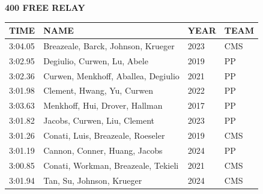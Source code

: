 \begin{table}[H]
\centering
\begin{minipage}[t]{0.6\textwidth}
\centering
\textbf{400 FREE RELAY}\\[0.1cm]
\begin{tabular}{@{}p{1.8cm}p{2.8cm}p{1.2cm}p{1.4cm}@{}}
\hline
    \textbf{TIME} & \textbf{NAME} & \textbf{YEAR} & \textbf{TEAM} \\
\hline
    3:04.05 & Breazeale, Barck, Johnson, Krueger & 2023 & CMS \\
    3:02.95 & Degiulio, Curwen, Lu, Abele & 2019 & PP \\
    3:02.36 & Curwen, Menkhoff, Aballea, Degiulio & 2021 & PP \\
    3:01.98 & Clement, Hwang, Yu, Curwen & 2022 & PP \\
    3:03.63 & Menkhoff, Hui, Drover, Hallman & 2017 & PP \\
    3:01.82 & Jacobs, Curwen, Liu, Clement & 2023 & PP \\
    3:01.26 & Conati, Luis, Breazeale, Roeseler & 2019 & CMS \\
    3:01.19 & Cannon, Conner, Huang, Jacobs & 2024 & PP \\
    3:00.85 & Conati, Workman, Breazeale, Tekieli & 2021 & CMS \\
    3:01.94 & Tan, Su, Johnson, Krueger & 2024 & CMS \\
\hline
\end{tabular}
\end{minipage}
\end{table}

